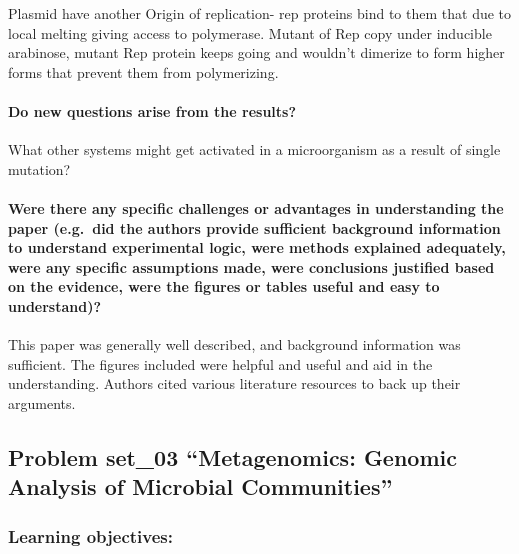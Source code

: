 \documentclass[]{article}
\let\oldparagraph\paragraph
\renewcommand{\paragraph}[1]{\oldparagraph{#1}\mbox{}}
\begin{document}
Plasmid have another Origin of replication- rep proteins bind to them
that due to local melting giving access to polymerase. Mutant of Rep
copy under inducible arabinose, mutant Rep protein keeps going and
wouldn't dimerize to form higher forms that prevent them from
polymerizing.

\paragraph{Do new questions arise from the
results?}\label{do-new-questions-arise-from-the-results-2}

What other systems might get activated in a microorganism as a result of
single mutation?

\paragraph{Were there any specific challenges or advantages in
understanding the paper (e.g.~did the authors provide sufficient
background information to understand experimental logic, were methods
explained adequately, were any specific assumptions made, were
conclusions justified based on the evidence, were the figures or tables
useful and easy to
understand)?}\label{were-there-any-specific-challenges-or-advantages-in-understanding-the-paper-e.g.did-the-authors-provide-sufficient-background-information-to-understand-experimental-logic-were-methods-explained-adequately-were-any-specific-assumptions-made-were-conclusions-justified-based-on-the-evidence-were-the-figures-or-tables-useful-and-easy-to-understand-2}

This paper was generally well described, and background information was
sufficient. The figures included were helpful and useful and aid in the
understanding. Authors cited various literature resources to back up
their arguments.

\subsection{\texorpdfstring{Problem set\_03 ``Metagenomics: Genomic
Analysis of Microbial
Communities''}{Problem set\_03 Metagenomics: Genomic Analysis of Microbial Communities}}\label{problem-set_03-metagenomics-genomic-analysis-of-microbial-communities}

\subsubsection{Learning objectives:}\label{learning-objectives-5}
\end{document}
